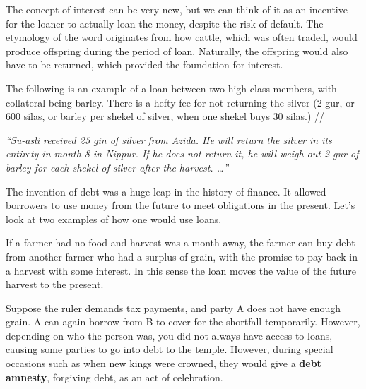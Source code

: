 \documentclass{article}
\begin{document}
    The concept of interest can be very new, but we can think of it as an incentive for the loaner to actually loan the money, despite the risk of default. The etymology of the word originates from how cattle, which was often traded, would produce offspring during the period of loan. Naturally, the offspring would also have to be returned, which provided the foundation for interest. 

    \begin{example}
      \label{ex:sumerian-personal-loan}
      The following is an example of a loan between two high-class members, with collateral being barley. There is a hefty fee for not returning the silver (2 gur, or 600 silas, or barley per shekel of silver, when one shekel buys 30 silas.)
      //

      \begin{center}
        \textit{“Su-asli received 25 gin of silver from Azida. He will return the silver in its entirety in month 8 in Nippur. If he does not return it, he will weigh out 2 gur of barley for each shekel of silver after the harvest. …”}
      \end{center}
    \end{example}

    The invention of debt was a huge leap in the history of finance. It allowed borrowers to use money from the future to meet obligations in the present. Let's look at two examples of how one would use loans. 

    \begin{example}[Crops]
      \label{ex:crops}
      If a farmer had no food and harvest was a month away, the farmer can buy debt from another farmer who had a surplus of grain, with the promise to pay back in a harvest with some interest. In this sense the loan moves the value of the future harvest to the present. 
    \end{example}

    \begin{example}
      \label{ex:tax-repayments}
      Suppose the ruler demands tax payments, and party A does not have enough grain. A can again borrow from B to cover for the shortfall temporarily. However, depending on who the person was, you did not always have access to loans, causing some parties to go into debt to the temple. However, during special occasions such as when new kings were crowned, they would give a \textbf{debt amnesty}, forgiving debt, as an act of celebration. 
    \end{example}
\end{document}
